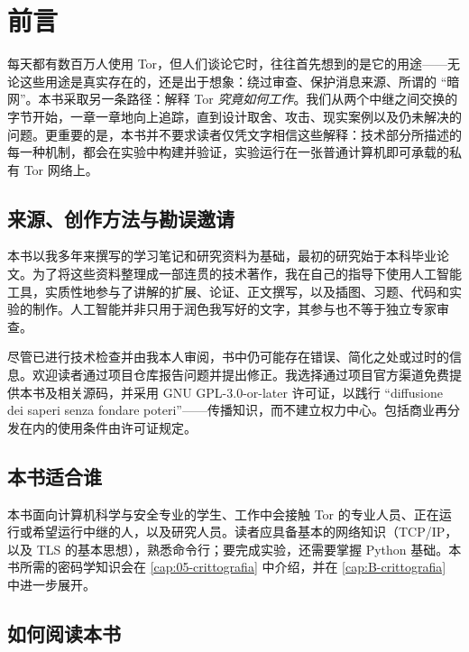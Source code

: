 \chapter{前言}

每天都有数百万人使用 Tor，但人们谈论它时，往往首先想到的是它的用途——无论这些用途是真实存在的，还是出于想象：绕过审查、保护消息来源、所谓的 \enquote{暗网}。本书采取另一条路径：解释 Tor \emph{究竟如何工作}。我们从两个中继之间交换的字节开始，一章一章地向上追踪，直到设计取舍、攻击、现实案例以及仍未解决的问题。更重要的是，本书并不要求读者仅凭文字相信这些解释：技术部分所描述的每一种机制，都会在实验中构建并验证，实验运行在一张普通计算机即可承载的私有 Tor 网络上。

\section*{来源、创作方法与勘误邀请}

本书以我多年来撰写的学习笔记和研究资料为基础，最初的研究始于本科毕业论文。为了将这些资料整理成一部连贯的技术著作，我在自己的指导下使用人工智能工具，实质性地参与了讲解的扩展、论证、正文撰写，以及插图、习题、代码和实验的制作。人工智能并非只用于润色我写好的文字，其参与也不等于独立专家审查。

尽管已进行技术检查并由我本人审阅，书中仍可能存在错误、简化之处或过时的信息。欢迎读者通过项目仓库报告问题并提出修正。我选择通过项目官方渠道免费提供本书及相关源码，并采用 GNU GPL-3.0-or-later 许可证，以践行 \enquote{diffusione dei saperi senza fondare poteri}——传播知识，而不建立权力中心。包括商业再分发在内的使用条件由许可证规定。

\section*{本书适合谁}

本书面向计算机科学与安全专业的学生、工作中会接触 Tor 的专业人员、正在运行或希望运行中继的人，以及研究人员。读者应具备基本的网络知识（TCP/IP，以及 TLS 的基本思想），熟悉命令行；要完成实验，还需要掌握 Python 基础。本书所需的密码学知识会在 \cref{cap:05-crittografia} 中介绍，并在 \cref{cap:B-crittografia} 中进一步展开。

\section*{如何阅读本书}

